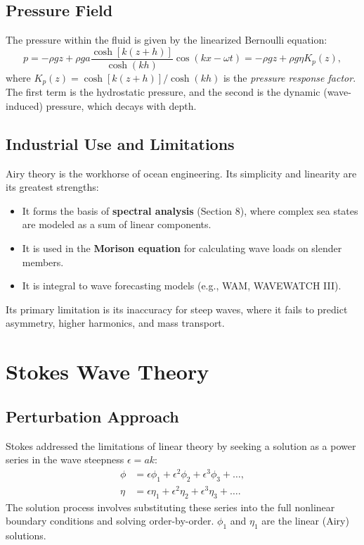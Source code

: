 \documentclass[11pt,a4paper]{article}
\begin{document}
\subsection{Pressure Field}
The pressure within the fluid is given by the linearized Bernoulli equation:
\begin{equation}
p = -\rho g z + \rho g a \frac{\cosh[k(z+h)]}{\cosh(kh)} \cos(kx - \omega t) = -\rho g z + \rho g \eta K_p(z),
\label{eq:airypressure}
\end{equation}
where $K_p(z) = \cosh[k(z+h)] / \cosh(kh)$ is the \emph{pressure response factor}. The first term is the hydrostatic pressure, and the second is the dynamic (wave-induced) pressure, which decays with depth.

\subsection{Industrial Use and Limitations}
Airy theory is the workhorse of ocean engineering. Its simplicity and linearity are its greatest strengths:
\begin{itemize}
    \item It forms the basis of \textbf{spectral analysis} (Section 8), where complex sea states are modeled as a sum of linear components.
    \item It is used in the \textbf{Morison equation} for calculating wave loads on slender members.
    \item It is integral to wave forecasting models (e.g., WAM, WAVEWATCH III).
\end{itemize}
Its primary limitation is its inaccuracy for steep waves, where it fails to predict asymmetry, higher harmonics, and mass transport.

\section{Stokes Wave Theory}
\subsection{Perturbation Approach}
Stokes addressed the limitations of linear theory by seeking a solution as a power series in the wave steepness $\epsilon = ak$:
\begin{align}
\phi &= \epsilon \phi_1 + \epsilon^2 \phi_2 + \epsilon^3 \phi_3 + \dots, \\
\eta &= \epsilon \eta_1 + \epsilon^2 \eta_2 + \epsilon^3 \eta_3 + \dots.
\end{align}
The solution process involves substituting these series into the full nonlinear boundary conditions and solving order-by-order. $\phi_1$ and $\eta_1$ are the linear (Airy) solutions.
\end{document}
